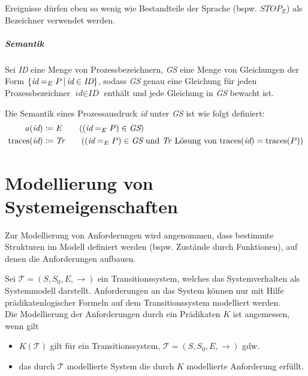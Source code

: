 						Ereignisse dürfen eben so wenig wie Bestandteile der Sprache (bspw. $ \textit{STOP} _ E $) als Bezeichner verwendet werden.



					\subparagraph{Semantik}
						Sei \textit{ID} eine Menge von Prozessbezeichnern, \textit{GS} eine Menge von Gleichungen der Form $ \{ \textit{id} = _ E P \,\vert\, \textit{id} \in \textit{ID} \} $, sodass \textit{GS} genau eine Gleichung für jeden Prozessbezeichner $ \textit{id} \in \textit{ID} $ enthält und jede Gleichung in \textit{GS} bewacht ist.

						Die Semantik eines Prozessausdruck \textit{id} unter \textit{GS} ist wie folgt definiert:
						\begin{align*}
							a(\textit{id})             & \coloneqq E \tag{$ (\textit{id} = _ E P) \in \textit{GS} $}                                                                                        \\
							\text{traces}(\textit{id}) & \coloneqq \textit{Tr} \tag{$ (\textit{id} = _ E P) \in \textit{GS} $ und \textit{Tr} Lösung von $ \text{traces}(\textit{id}) = \text{traces}(P) $} \\
						\end{align*}

	\section{Modellierung von Systemeigenschaften}
		Zur Modellierung von Anforderungen wird angenommen, dass bestimmte Strukturen im Modell definiert werden (bspw. Zustände durch Funktionen), auf denen die Anforderungen aufbauen.

		Sei $ \mathcal{T} = (S, S _ 0, E, \rightarrow) $ ein Transitionssystem, welches das Systemverhalten als Systemmodell darstellt. Anforderungen an das System können nur mit Hilfe prädikatenlogischer Formeln auf dem Transitionssystem modelliert werden. \\
		Die Modellierung der Anforderungen durch ein Prädikaten $ K $ ist angemessen, wenn gilt
		\begin{itemize}
			\item $ K(\mathcal{T}) $ gilt für ein Transitionssystem, $ \mathcal{T} = (S, S _ 0, E, \rightarrow) $ gdw.
			\item das durch $ \mathcal{T} $ modellierte System die durch $ K $ modellierte Anforderung erfüllt.
		\end{itemize}

